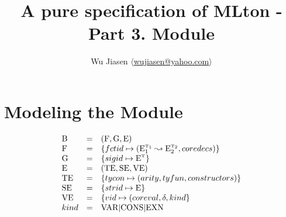 \documentclass[11pt,a4paper]{article}
\newcommand{\B}  {\textrm{B}}
\newcommand{\E}  {\textrm{E}}
\newcommand{\sT} {\textrm{\tiny T}}
\newcommand{\TE} {\textrm{TE}}
\newcommand{\VE} {\textrm{VE}}
\newcommand{\SE} {\textrm{SE}}
\renewcommand{\G}{\textrm{G}}
\newcommand{\F}  {\textrm{F}}
\newcommand{\VKE}  {\textrm{EXN}}
\newcommand{\VKV}  {\textrm{VAR}}
\newcommand{\VKC}  {\textrm{CONS}}
\newcommand{\braced}[1]{\{#1\}}
\newcommand{\fctor}[2]{#1 \leadsto #2}
\begin{document}
\title {A pure specification of MLton - Part 3. Module}
\author{Wu Jiasen $\langle$\href{mailto:wujiasen@yahoo.com}{wujiasen@yahoo.com}$\rangle$}
\maketitle 

\section{Modeling the Module}
\[\begin{array}{lcl}
    \B & = & (\F, \G, \E) \\
    \F & = & \braced{fctid \mapsto (\fctor{\E_1^{\sT_1}}{\E_2^{\sT_2}}, coredecs)} \\
    \G & = & \braced{sigid \mapsto \E^\sT} \\
    \E & = & (\TE,\SE,\VE)  \\
    \TE& = & \braced{tycon \mapsto (arity, tyfun, constructors)} \\
    \SE& = & \braced{strid \mapsto \E}  \\ 
    \VE& = & \braced{vid   \mapsto (coreval,\delta, kind} \\
    kind & = & \VKV | \VKC | \VKE \\
\end{array}\]
\end{document}
